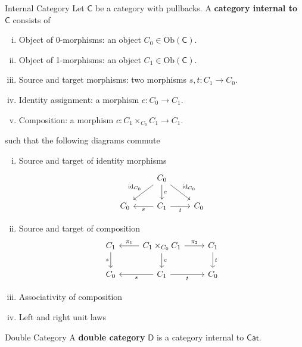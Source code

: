 \begin{definition}{Internal Category}{}
    Let $\mathsf{C}$ be a category with pullbacks. A \textbf{category internal to $\mathsf{C}$} consists of
    \begin{enumerate}[(i)]
        \item Object of 0-morphisms: an object $C_0\in \mathrm{Ob}(\mathsf{C})$.
        \item Object of 1-morphisms: an object $C_1\in \mathrm{Ob}(\mathsf{C})$.
        \item Source and target morphisms: two morphisms $s,t:C_1\to C_0$.
        \item Identity assignment: a morphism $e:C_0\to C_1$.
        \item Composition: a morphism $c:C_1\times_{C_0}C_1\to C_1$.
    \end{enumerate}
    such that the following diagrams commute
    \begin{enumerate}[(i)]
        \item Source and target of identity morphisms
        \[
            \begin{tikzcd}[ampersand replacement=\&]
                \& C_0\arrow[rd, "\mathrm{id}_{C_0}"]  \arrow[ld, "\mathrm{id}_{C_0}"']\arrow[d, "e"] \&   \\
                C_0  \& C_1  \arrow[l, "s"] \arrow[r, "t"']    \&   C_0
            \end{tikzcd}
        \]
        \item Source and target of composition
        \[
            \begin{tikzcd}[ampersand replacement=\&]
                C_1\arrow[d, "s"'] \&C_1\times_{C_0}C_1 \arrow[d, "c"]\arrow[l, "\pi_1"']\arrow[r, "\pi_2"] \& C_1 \arrow[d, "t"] \\
                C_0\&C_1 \arrow[l, "s"]\arrow[r, "t"'] \& C_0                  
            \end{tikzcd}
        \]
        \item Associativity of composition 
        \item Left and right unit laws       
    \end{enumerate}
\end{definition}


\begin{definition}{Double Category}{}
    A \textbf{double category} $\mathsf{D}$ is a category internal to $\mathsf{Cat}$.
\end{definition}


